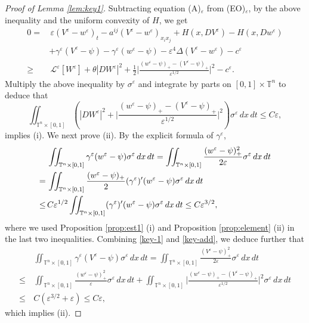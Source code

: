 \documentclass[12pt,reqno]{amsart}
\theoremstyle{plain}
\theoremstyle{remark}
\numberwithin{equation}{section}
\begin{document}
\begin{proof}[Proof of Lemma {\rm\ref{lem:key1}}]
Subtracting equation (A)$_{\varepsilon}$ from (EO)$_{\varepsilon}$,
by the above inequality and the uniform convexity of $H$, we get
\begin{align*}
0=&\,
{\varepsilon} (V^{\varepsilon}-w^{\varepsilon})_t -a^{ij}(V^{\varepsilon}-w^{\varepsilon})_{x_ix_j}
+ H(x,DV^{\varepsilon})-H(x,Dw^{\varepsilon})\\
&+{\gamma}^{\varepsilon}(V^{\varepsilon}-\psi)-{\gamma}^{\varepsilon}(w^{\varepsilon}-\psi)
-{\varepsilon}^4{\Delta} (V^{\varepsilon}-w^{\varepsilon})-c^{\varepsilon}\\
\ge&\, 
{\mathcal{L}}^{\varepsilon}[W^{\varepsilon}]
+\theta | DW^{\varepsilon}|^2
+\frac{1}{2}\Big|\frac{(w^{\varepsilon}-\psi)_{+}-(V^{\varepsilon}-\psi)_{+}}{{\varepsilon}^{1/2}}\Big|^2
-c^{\varepsilon}.
\end{align*}
Multiply the above inequality by ${\sigma}^{\varepsilon}$ and integrate by parts on $[0,1] \times {\mathbb{T}}^n$ to deduce that
\begin{equation} \label{key-1}
\iint_{{\mathbb{T}}^n\times[0,1]}\left( |DW^{\varepsilon}|^2
+\Big|\frac{(w^{\varepsilon}-\psi)_{+}-(V^{\varepsilon}-\psi)_{+}}{{\varepsilon}^{1/2}}\Big|^2\right) {\sigma}^{\varepsilon}\,dx\,dt \le C {\varepsilon},  
\end{equation}
implies (i). 
We next prove (ii).
By the explicit formula of ${\gamma}^{\varepsilon}$, 
\begin{align}
&\iint_{{\mathbb{T}}^n \times [0,1]} {\gamma}^{\varepsilon}(w^{\varepsilon}-\psi){\sigma}^{\varepsilon}\,dx\,dt
=\iint_{{\mathbb{T}}^n \times [0,1]}  \frac{ (w^{\varepsilon}-\psi)^2_+}{2{\varepsilon}} {\sigma}^{\varepsilon}\,dx\,dt \notag\\
=\,&
\iint_{{\mathbb{T}}^n \times [0,1]} \frac{(w^{\varepsilon}-\psi)_+}{2} ({\gamma}^{\varepsilon})'(w^{\varepsilon}-\psi) {\sigma}^{\varepsilon}\,dx\,dt \notag\\
\leq\,&
 C{\varepsilon}^{1/2} \iint_{{\mathbb{T}}^n \times [0,1]}  ({\gamma}^{\varepsilon})'(w^{\varepsilon}-\psi) {\sigma}^{\varepsilon}\,dx\,dt
\leq C {\varepsilon}^{3/2}, \label{key-add}
\end{align}
where we used Proposition \ref{prop:est1} (i) and Proposition \ref{prop:element} (ii)
in the last two inequalities. 
Combining \eqref{key-1} and \eqref{key-add}, we deduce further that
\begin{align*}
&\iint_{{\mathbb{T}}^n \times [0,1]} {\gamma}^{\varepsilon}(V^{\varepsilon}-\psi){\sigma}^{\varepsilon}\,dx\,dt
=\iint_{{\mathbb{T}}^n \times [0,1]} \frac{(V^{\varepsilon}-\psi)_+^2}{2{\varepsilon}}{\sigma}^{\varepsilon}\,dx\,dt\\
\leq \,&
\iint_{{\mathbb{T}}^n \times [0,1]} \frac{(w^{\varepsilon}-\psi)_+^2}{\varepsilon}{\sigma}^{\varepsilon}\,dx\,dt
+
\iint_{{\mathbb{T}}^n\times[0,1]}
\Big|\frac{(w^{\varepsilon}-\psi)_{+}-(V^{\varepsilon}-\psi)_{+}}{{\varepsilon}^{1/2}}\Big|^2 {\sigma}^{\varepsilon}\,dx\,dt\\
\leq\, &
C({\varepsilon}^{3/2}+{\varepsilon})\le C{\varepsilon},
\end{align*}
which implies (ii). 
\end{proof}
\end{document}
